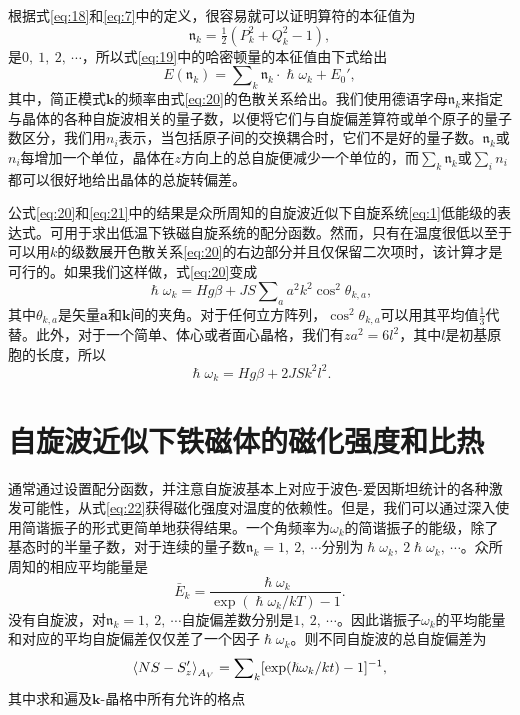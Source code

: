 \documentclass{article}
\begin{document}
根据式\eqref{eq:18}和\eqref{eq:7}中的定义，很容易就可以证明算符的本征值为
\begin{equation*}
\mathfrak{n}_k=\tfrac{1}{2}(P_k^2+Q_k^2-1),
\end{equation*}
是$0,~1,~2,~\cdots$，所以式\eqref{eq:19}中的哈密顿量的本征值由下式给出
\begin{equation} \label{eq:21}
E(\mathfrak{n}_k)=\sum\nolimits_k\mathfrak{n}_k\cdot\hslash\omega_k+E_0',
\end{equation}
其中，简正模式$\mathbf{k}$的频率由式\eqref{eq:20}的色散关系给出。我们使用德语字母$\mathfrak{n}_k$来指定与晶体的各种自旋波相关的量子数，以便将它们与自旋偏差算符或单个原子的量子数区分，我们用$n_i$表示，当包括原子间的交换耦合时，它们不是好的量子数。$\mathfrak{n}_k$或$n_i$每增加一个单位，晶体在$z$方向上的总自旋便减少一个单位的，而$\sum_k\mathfrak{n}_k$或$\sum_i n_i$都可以很好地给出晶体的总旋转偏差。


公式\eqref{eq:20}和\eqref{eq:21}中的结果是众所周知的自旋波近似下自旋系统\eqref{eq:1}低能级的表达式。可用于求出低温下铁磁自旋系统的配分函数。然而，只有在温度很低以至于可以用$k$的级数展开色散关系\eqref{eq:20}的右边部分并且仅保留二次项时，该计算才是可行的。如果我们这样做，式\eqref{eq:20}变成
\begin{equation} \label{eq:22}
\hslash\omega_k=Hg\beta+JS\sum\nolimits_aa^2k^2\cos^2\theta_{k,a},
\end{equation}
其中$\theta_{k,a}$是矢量$\mathbf{a}$和$\mathbf{k}$间的夹角。对于任何立方阵列，$\cos^2\theta_{k,a}$可以用其平均值$\frac{1}{3}$代替。此外，对于一个简单、体心或者面心晶格，我们有$za^2=6l^2$，其中$l$是初基原胞的长度，所以
\begin{equation} \label{eq:23}
\hslash\omega_k=Hg\beta+2JSk^2l^2.
\end{equation}




\section{自旋波近似下铁磁体的磁化强度和比热} \label{sec:4}

通常通过设置配分函数，并注意自旋波基本上对应于波色-爱因斯坦统计的各种激发可能性，从式\eqref{eq:22}获得磁化强度对温度的依赖性。但是，我们可以通过深入使用简谐振子的形式更简单地获得结果。一个角频率为$\omega_k$的简谐振子的能级，除了基态时的半量子数，对于连续的量子数$\mathfrak{n}_k=1,~2,~\cdots$分别为$\hslash\omega_k,~2\hslash\omega_k,~\cdots$。众所周知的相应平均能量是
\begin{equation} \label{eq:24}
\bar{E}_k=\frac{\hslash\omega_k}{\exp(\hslash\omega_k/kT)-1}.
\end{equation}
没有自旋波，对$\mathfrak{n}_k=1,~2,~\cdots$自旋偏差数分别是$1,~2,~\cdots$。因此谐振子$\omega_k$的平均能量和对应的平均自旋偏差仅仅差了一个因子$\hslash\omega_k$。则不同自旋波的总自旋偏差为
\begin{equation} \label{eq:25}
\braket{NS-S_z'}_{A_V}=\sum\nolimits_k[\exp(\hslash\omega_k/kt)-1]^{-1},
\end{equation}
其中求和遍及$\mathbf{k}$-晶格中所有允许的格点
\end{document}
